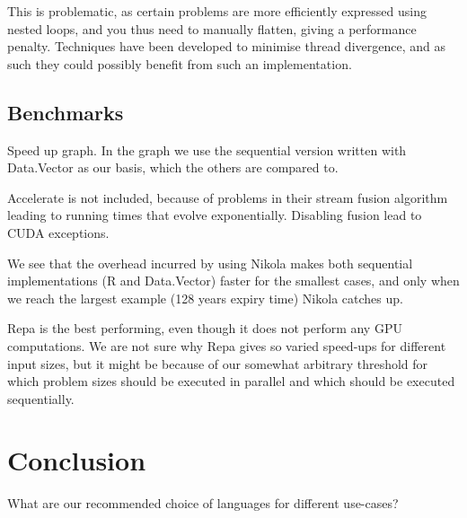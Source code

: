This is problematic, as certain problems are more efficiently
expressed using nested loops, and you thus need to manually flatten,
giving a performance penalty. Techniques have been developed to
minimise thread divergence, and as such they could possibly benefit
from such an implementation.


\section{Benchmarks}
Speed up graph. In the graph we use the sequential version written
with Data.Vector as our basis, which the others are compared to.

Accelerate is not included, because of problems in their stream fusion
algorithm leading to running times that evolve
exponentially. Disabling fusion lead to CUDA exceptions.

We see that the overhead incurred by using Nikola makes both
sequential implementations (R and Data.Vector) faster for the smallest
cases, and only when we reach the largest example (128 years expiry
time) Nikola catches up.

Repa is the best performing, even though it does not perform any GPU
computations. We are not sure why Repa gives so varied speed-ups for
different input sizes, but it might be because of our somewhat
arbitrary threshold for which problem sizes should be executed in
parallel and which should be executed sequentially.


\chapter{Conclusion}
What are our recommended choice of languages for different use-cases?


